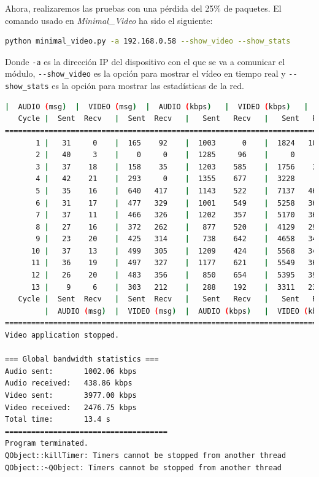 Ahora, realizaremos las pruebas con una pérdida del 25\% de paquetes. El comando usado en \textit{Minimal\_Video} ha sido el siguiente:

\begin{lstlisting}[language=bash]
python minimal_video.py -a 192.168.0.58 --show_video --show_stats
\end{lstlisting}
Donde \verb|-a| es la dirección IP del dispositivo con el que se va a comunicar el módulo, \verb|--show_video| es la opción para mostrar el vídeo en tiempo real y \verb|--show_stats| es la opción para mostrar las estadísticas de la red.
\vspace{\baselineskip}

\begin{lstlisting}[language=bash,basicstyle=\ttfamily\tiny]
         |  AUDIO (msg)  |  VIDEO (msg)  |  AUDIO (kbps)   |  VIDEO (kbps)   |     CPU (%) 
   Cycle |  Sent  Recv   |  Sent  Recv   |   Sent   Recv   |   Sent   Recv   | Program System
================================================================================================
       1 |   31     0    |  165    92    |  1003      0    |  1824   1018    |  36     75       
       2 |   40     3    |    0     0    |  1285     96    |     0      0    |  47     76       
       3 |   37    18    |  158    35    |  1203    585    |  1756    387    |  51     77       
       4 |   42    21    |  293     0    |  1355    677    |  3228      0    |  42     68       
       5 |   35    16    |  640   417    |  1143    522    |  7137   4654    |  37     68       
       6 |   31    17    |  477   329    |  1001    549    |  5258   3627    |  34     67       
       7 |   37    11    |  466   326    |  1202    357    |  5170   3617    |  51     71       
       8 |   27    16    |  372   262    |   877    520    |  4129   2907    |  26     69       
       9 |   23    20    |  425   314    |   738    642    |  4658   3444    |  35     72       
      10 |   37    13    |  499   305    |  1209    424    |  5568   3403    |  38     72       
      11 |   36    19    |  497   327    |  1177    621    |  5549   3651    |  33     72       
      12 |   26    20    |  483   356    |   850    654    |  5395   3979    |  32     69       
      13 |    9     6    |  303   212    |   288    192    |  3311   2317    |  14     42       
   Cycle |  Sent  Recv   |  Sent  Recv   |   Sent   Recv   |   Sent   Recv   | Program System
         |  AUDIO (msg)  |  VIDEO (msg)  |  AUDIO (kbps)   |  VIDEO (kbps)   |     CPU (%) 
===========================================================================================
Video application stopped.

=== Global bandwidth statistics ===
Audio sent:       1002.06 kbps
Audio received:   438.86 kbps
Video sent:       3977.00 kbps
Video received:   2476.75 kbps
Total time:       13.4 s
=====================================
Program terminated.
QObject::killTimer: Timers cannot be stopped from another thread
QObject::~QObject: Timers cannot be stopped from another thread
\end{lstlisting}
\vspace{\baselineskip}

